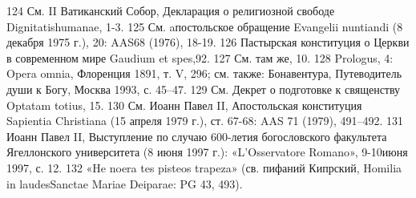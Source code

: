\documentclass[a5paper,10pt]{article}
\begin{document}
124 См. II Ватиканский Собор, Декларация о религиозной свободе Dignitatishumanae, 1-3.
125 См. aпостольское обращение Evangelii nuntiandi (8 декабря 1975 г.), 20: AAS68 (1976), 18-19.
126 Пастырская конституция о Церкви в современном мире Gaudium et spes,92.
127 См. там же, 10.
128 Prologus, 4: Opera omnia, Флоренция 1891, т. V, 296; см. также: Бонавентура, Путеводитель души к Богу, Москва 1993, с. 45–47.
129 См. Декрет о подготовке к священству Optatam totius, 15.
130 См. Иоанн Павел II, Апостольская конституция Sapientia Christiana (15 апреля 1979 г.), ст. 67-68: AAS 71 (1979), 491–492.
131 Иоанн Павел II, Выступление по случаю 600-летия богословского факультета Ягеллонского университета (8 июня 1997 г.): «L'Osservatore Romano», 9-10июня 1997, с. 12.
132 «He noera tes pisteos trapeza» (св. пифаний Кипрский, Homilia in laudesSanctae Mariae Deiparae: PG 43, 493).
\end{document}
